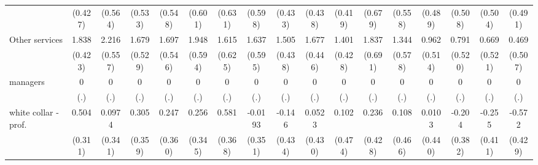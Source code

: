 {\begin{tabular}{l*{16}{c}}
                    &     (0.427)         &     (0.564)         &     (0.533)         &     (0.548)         &     (0.601)         &     (0.631)         &     (0.598)         &     (0.433)         &     (0.438)         &     (0.419)         &     (0.679)         &     (0.558)         &     (0.489)         &     (0.508)         &     (0.504)         &     (0.491)         \\
[1em]
Other services      &       1.838\sym{***}&       2.216\sym{***}&       1.679\sym{**} &       1.697\sym{**} &       1.948\sym{**} &       1.615\sym{**} &       1.637\sym{**} &       1.505\sym{***}&       1.677\sym{***}&       1.401\sym{**} &       1.837\sym{**} &       1.344\sym{*}  &       0.962         &       0.791         &       0.669         &       0.469         \\
                    &     (0.423)         &     (0.557)         &     (0.529)         &     (0.546)         &     (0.594)         &     (0.625)         &     (0.595)         &     (0.438)         &     (0.446)         &     (0.428)         &     (0.691)         &     (0.578)         &     (0.514)         &     (0.520)         &     (0.521)         &     (0.507)         \\
[1em]
managers            &           0         &           0         &           0         &           0         &           0         &           0         &           0         &           0         &           0         &           0         &           0         &           0         &           0         &           0         &           0         &           0         \\
                    &         (.)         &         (.)         &         (.)         &         (.)         &         (.)         &         (.)         &         (.)         &         (.)         &         (.)         &         (.)         &         (.)         &         (.)         &         (.)         &         (.)         &         (.)         &         (.)         \\
[1em]
white collar - prof.&       0.504         &      0.0974         &       0.305         &       0.247         &       0.256         &       0.581         &     -0.0193         &      -0.146         &      0.0523         &       0.102         &       0.236         &       0.108         &      0.0103         &      -0.204         &      -0.255         &      -0.572         \\
                    &     (0.311)         &     (0.341)         &     (0.359)         &     (0.360)         &     (0.345)         &     (0.368)         &     (0.351)         &     (0.434)         &     (0.430)         &     (0.474)         &     (0.428)         &     (0.466)         &     (0.440)         &     (0.382)         &     (0.411)         &     (0.429)         \\

\end{tabular}}
